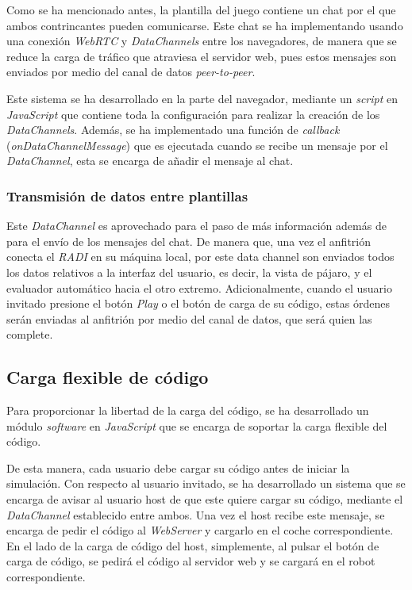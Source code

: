 \documentclass[a4paper, 12pt]{book}
\begin{document}
Como se ha mencionado antes, la plantilla del juego contiene un chat por el que ambos contrincantes pueden comunicarse. Este chat se ha implementando usando una conexión \emph{WebRTC} y \emph{DataChannels} entre los navegadores, de manera que se reduce la carga de tráfico que atraviesa el servidor web, pues estos mensajes son enviados por medio del canal de datos \emph{peer-to-peer}.

Este sistema se ha desarrollado en la parte del navegador, mediante un \emph{script} en \emph{JavaScript} que contiene toda la configuración para realizar la creación de los \emph{DataChannels}. Además, se ha implementado una función de \emph{callback} (\emph{onDataChannelMessage}) que es ejecutada cuando se recibe un mensaje por el \emph{DataChannel}, esta se encarga de añadir el mensaje al chat.

\subsubsection{Transmisión de datos entre plantillas}

Este \emph{DataChannel} es aprovechado para el paso de más información además de para el envío de los mensajes del chat. De manera que, una vez el anfitrión conecta el \emph{RADI} en su máquina local, por este data channel son enviados todos los datos relativos a la interfaz del usuario, es decir, la vista de pájaro, y el evaluador automático hacia el otro extremo. Adicionalmente, cuando el usuario invitado presione el botón \emph{Play} o el botón de carga de su código, estas órdenes serán enviadas al anfitrión por medio del canal de datos, que será quien las complete.

\subsection{Carga flexible de código}

Para proporcionar la libertad de la carga del código, se ha desarrollado un módulo \emph{software} en \emph{JavaScript} que se encarga de soportar la carga flexible del código.

De esta manera, cada usuario debe cargar su código antes de iniciar la simulación. Con respecto al usuario invitado, se ha desarrollado un sistema que se encarga de avisar al usuario host de que este quiere cargar su código, mediante el \emph{DataChannel} establecido entre ambos. Una vez el host recibe este mensaje, se encarga de pedir el código al \emph{WebServer} y cargarlo en el coche correspondiente. En el lado de la carga de código del host, simplemente, al pulsar el botón de carga de código, se pedirá el código al servidor web y se cargará en el robot correspondiente.
\end{document}
